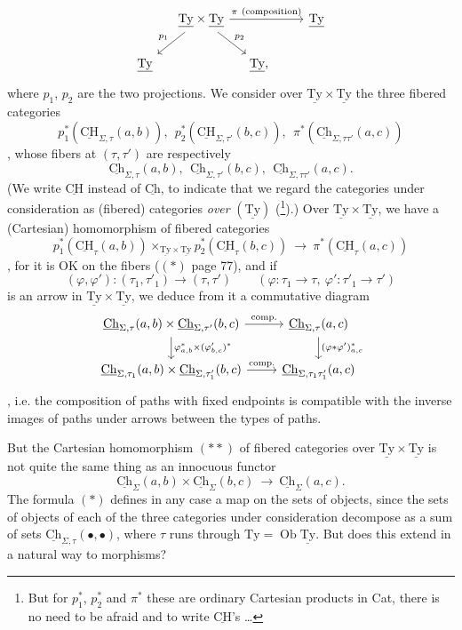 \documentclass[11pt]{article}
\newcommand{\printedpage}[1]{\marginpar{\footnotesize p.~#1}}
\newcommand{\msp}[1]{\marginpar{\footnotesize [#1]}}
\newcommand{\Ch}{\underline{\mathrm{Ch}}}
\newcommand{\CH}{\underline{\mathrm{CH}}}
\newcommand{\Ty}{\underline{\mathrm{Ty}}}
\begin{document}
\[
\begin{tikzcd}[column sep=small]
 & \Ty\times\Ty \ar[rrr,"\pi\ (\text{composition})"] \ar[dl,"p_1"'] \ar[dr,"p_2"] & & & \Ty \\
\Ty & & \Ty, & &
\end{tikzcd}
\]
where $p_1$, $p_2$ are the two projections. We consider over $\Ty\times\Ty$ the three fibered categories %
\[
p_1^*(\CH_{\Sigma,\tau}(a,b)),\ \ p_2^*(\CH_{\Sigma,\tau'}(b,c)),\ \ \pi^*(\Ch_{\Sigma,\tau\tau'}(a,c))
\]
, whose fibers at $(\tau,\tau')$ are respectively %
\[
\Ch_{\Sigma,\tau}(a,b),\ \ \Ch_{\Sigma,\tau'}(b,c),\ \ \Ch_{\Sigma,\tau\tau'}(a,c).
\]
(We write $\CH$ instead of $\Ch$, to indicate that we regard the categories under consideration as (fibered) categories \textit{over} $(\Ty)$ (\footnote{But for $p_1^*$, $p_2^*$ and $\pi^*$ these are ordinary Cartesian products in Cat, there is no need to be afraid and to write $\CH$'s \ldots}).) Over $\Ty\times\Ty$, we have a (Cartesian) homomorphism of fibered categories
\[
p_1^*(\CH_{\tau}(a,b))\times_{\Ty\times\Ty} p_2^*(\CH_{\tau}(b,c)) \ \longrightarrow\ \pi^*(\CH_{\tau}(a,c)) \tag*{$(**)$}
\]
,
\msp{page 79}
for it is OK on the fibers ($(*)$ page 77), and if
\[
(\varphi,\varphi') : (\tau_1,\tau'_1) \longrightarrow (\tau,\tau') \qquad (\varphi : \tau_1 \longrightarrow \tau,\ \varphi' : \tau'_1 \longrightarrow \tau')
\]
is an arrow in $\Ty\times\Ty$, we deduce from it a commutative diagram
\[
\begin{tikzcd}
\Ch_{\Sigma,\tau}(a,b)\times\Ch_{\Sigma,\tau'}(b,c) \ar[r,"\text{comp.}"] \ar[d,"\varphi^*_{a,b}\times(\varphi'_{b,c})^*"] & \Ch_{\Sigma,\tau}(a,c) \ar[d,"(\varphi*\varphi')^*_{a,c}"] \\
\Ch_{\Sigma,\tau_1}(a,b)\times\Ch_{\Sigma,\tau'_1}(b,c) \ar[r,"\text{comp.}"] & \Ch_{\Sigma,\tau_1\tau'_1}(a,c)
\end{tikzcd}
\]
\printedpage{52}
, i.e. the composition of paths with fixed endpoints is compatible with the inverse images of paths under arrows between the types of paths.

But the Cartesian homomorphism $(**)$ of fibered categories over $\Ty\times\Ty$ is not quite the same thing as an innocuous functor
\[
\Ch_{\Sigma}(a,b)\times\Ch_{\Sigma}(b,c) \ \longrightarrow\ \Ch_{\Sigma}(a,c). \tag*{$(*)$}
\]
The formula $(*)$ defines in any case a map on the sets of objects, since the sets of objects of each of the three categories under consideration decompose as a sum of sets $\Ch_{\Sigma,\tau}(\bullet,\bullet)$, where $\tau$ runs through $\mathrm{Ty} = \operatorname{Ob}\Ty$. But does this extend in a natural way to morphisms?
\end{document}
